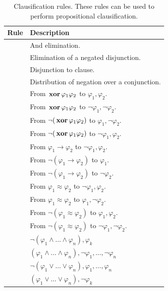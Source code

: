 \begin{xltabular}{\linewidth}{l X}
\caption{Clausification rules.  These rules can be used to perform propositional
clausification.}
\label{rule-tab:clausification}\\
	Rule & Description \\
	\hline
{} & And elimination. \\
 & Elimination of a negated disjunction. \\
 & Disjunction to clause. \\
 & Distribution of negation over a conjunction. \\
 & From $\,\mathbf{xor}\, \varphi_1 \varphi_2$ to $\varphi_1, \varphi_2$. \\
 & From $\,\mathbf{xor}\, \varphi_1 \varphi_2$ to $\neg\varphi_1, \neg\varphi_2$. \\
 & From $\neg(\,\mathbf{xor}\, \varphi_1 \varphi_2)$ to $\varphi_1, \neg\varphi_2$. \\
 & From $\neg(\,\mathbf{xor}\, \varphi_1 \varphi_2)$ to $\neg\varphi_1, \varphi_2$. \\
 & From $ \varphi_1\rightarrow\varphi_2 $ to $\neg\varphi_1 , \varphi_2 $. \\
 & From $\neg (\varphi_1\rightarrow\varphi_2)$ to $\varphi_1$. \\
 & From $\neg (\varphi_1\rightarrow\varphi_2)$ to $\neg\varphi_2$. \\
 & From $ \varphi_1≈\varphi_2$ to $\neg\varphi_1 , \varphi_2$. \\
 & From $ \varphi_1≈\varphi_2$ to $\varphi_1 , \neg\varphi_2$. \\
 & From $\neg(\varphi_1≈\varphi_2)$ to $\varphi_1 , \varphi_2$. \\
 & From $\neg(\varphi_1≈\varphi_2)$ to $\neg\varphi_1 , \neg\varphi_2$. \\
 & $\neg (\varphi_1 \land \dots \land \varphi_n), \varphi_k$\\
 & $(\varphi_1 \land \dots \land \varphi_n), \neg\varphi_1, \dots , \neg\varphi_n $ \\
 & $\neg (\varphi_1 \lor \dots \lor \varphi_n) , \varphi_1 , \dots
  , \varphi_n $ \\
 &
$ (\varphi_1 \lor \dots \lor \varphi_n) , \neg \varphi_k $\\

\end{xltabular}
